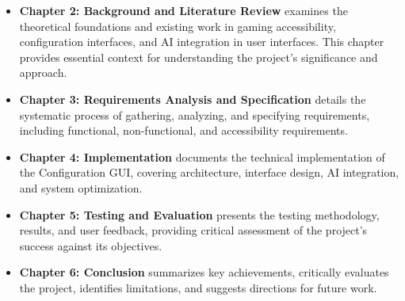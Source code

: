 \begin{itemize}
    \item \textbf{Chapter 2: Background and Literature Review} examines the theoretical foundations and existing work in gaming accessibility, configuration interfaces, and AI integration in user interfaces. This chapter provides essential context for understanding the project's significance and approach.
    
    \item \textbf{Chapter 3: Requirements Analysis and Specification} details the systematic process of gathering, analyzing, and specifying requirements, including functional, non-functional, and accessibility requirements.
    
    \item \textbf{Chapter 4: Implementation} documents the technical implementation of the Configuration GUI, covering architecture, interface design, AI integration, and system optimization.
    
    \item \textbf{Chapter 5: Testing and Evaluation} presents the testing methodology, results, and user feedback, providing critical assessment of the project's success against its objectives.
    
    \item \textbf{Chapter 6: Conclusion} summarizes key achievements, critically evaluates the project, identifies limitations, and suggests directions for future work.
\end{itemize}